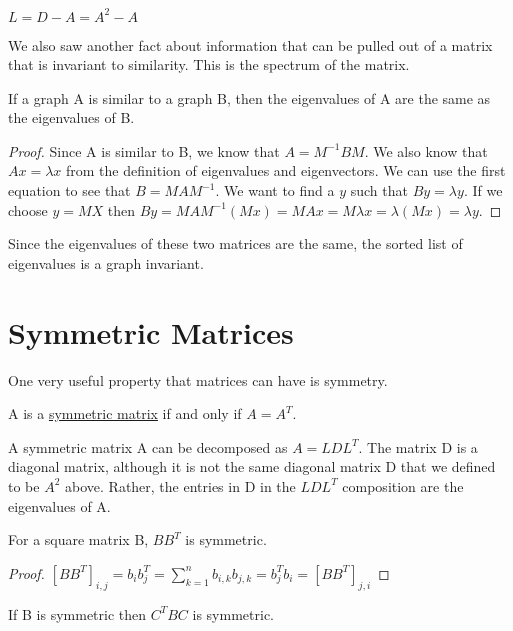 \documentclass{article}
\begin{document}
    $L = D - A = A^2 - A$
    
    We also saw another fact about information that can be pulled out of a matrix that is invariant to similarity. This is the spectrum of the matrix. 
    
    \begin{theorem}
    If a graph A is similar to a graph B, then the eigenvalues of A are the same as the eigenvalues of B.
    \end{theorem}
    
    \begin{proof}
    Since A is similar to B, we know that $A = M^{-1}BM$. We also know that $Ax = \lambda x$ from the definition of eigenvalues and eigenvectors. We can use the first equation to see that $B = MAM^{-1}$. We want to find a $y$ such that $By = \lambda y$. If we choose $y = MX$ then $By = MAM^{-1}(Mx) = MAx = M\lambda x = \lambda (Mx) = \lambda y$.
    \end{proof}
    
    Since the eigenvalues of these two matrices are the same, the sorted list of eigenvalues is a graph invariant.
    
    \section{Symmetric Matrices}
    
    One very useful property that matrices can have is symmetry.
    
    \begin{definition}
    A is a \underline{symmetric matrix} if and only if $A = A^T$.
    \end{definition}
    
     A symmetric matrix A can be decomposed as $A = LDL^T$. The matrix D is a diagonal matrix, although it is not the same diagonal matrix D that we defined to be $A^2$ above. Rather, the entries in D in the $LDL^T$ composition are the eigenvalues of A. 
    
    \begin{theorem}
    For a square matrix B, $BB^T$ is symmetric.
    \end{theorem}
    
    \begin{proof}
    $[BB^T]_{i,j} = b_ib_j^T = \sum_{k=1}^n b_{i,k}b_{j,k} = b_j^Tb_i = [BB^T]_{j,i}$
    \end{proof}
    
    \begin{theorem}
    If B is symmetric then $C^TBC$ is symmetric.
    \end{theorem}
    
\end{document}
